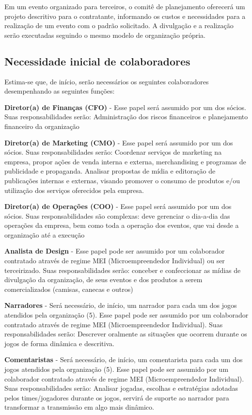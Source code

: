 \documentclass[a4paper, 12pt]{paper}
\begin{document}
Em um evento organizado para terceiros, o comitê de planejamento oferecerá um projeto descritivo para o contratante, informando os custos e necessidades para a realização de um evento com o padrão solicitado. A divulgação e a realização serão executadas seguindo o mesmo modelo de organização própria.

\subsection{Necessidade inicial de colaboradores}
Estima-se que, de início, serão necessários os seguintes colaboradores desempenhando as seguintes funções: 

\textbf{Diretor(a) de Finanças (CFO)} - Esse papel será assumido por um dos sócios. Suas responsabilidades serão: Administração dos riscos financeiros e planejamento financeiro da organização

\textbf{Diretor(a) de Marketing (CMO)} -  Esse papel será assumido por um dos sócios. Suas responsabilidades serão: Coordenar serviços de marketing na empresa,  propor ações de venda interna e externa, merchandising e programas de publicidade e propaganda. Analisar propostas de mídia e editoração de publicações internas e externas, visando promover o consumo de produtos e/ou utilização dos serviços oferecidos pela empresa.

\textbf{Diretor(a) de Operações (COO)} - Esse papel será assumido por um dos sócios. Suas responsabilidades são complexas: deve gerenciar o dia-a-dia das operações da empresa, bem como toda a operação dos eventos, que vai desde a organização até a execução

\textbf{Analista de Design} - Esse papel pode ser assumido por um colaborador contratado através de regime MEI (Microempreendedor Individual) ou ser terceirizado. Suas responsabilidades serão: conceber e confeccionar as mídias de divulgação da organização, de seus eventos e dos produtos a serem comercializados (camisas, canecas e outros)

\textbf{Narradores} - Será necessário, de início, um narrador para cada um dos jogos atendidos pela organização (5). Esse papel pode ser assumido por um colaborador contratado através de regime MEI (Microempreendedor Individual). Suas responsabilidades serão: Descrever oralmente as situações que ocorrem durante os jogos de forma dinâmica e descritiva.

\textbf{Comentaristas} - Será necessário, de início, um comentarista para cada um dos jogos atendidos pela organização (5). Esse papel pode ser assumido por um colaborador contratado através de regime MEI (Microempreendedor Individual). Suas responsabilidades serão: Analisar jogadas, escolhas e estratégias adotadas pelos times/jogadores durante os jogos, servirá de suporte ao narrador para transformar a transmissão em algo mais dinâmico.
\end{document}

